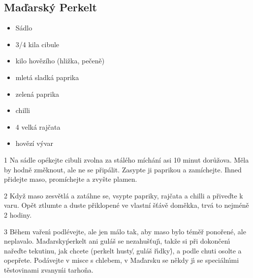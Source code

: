 \documentclass[10pt,a4paper]{article}
\newenvironment{myitemize}
{ \begin{itemize}
    \setlength{\itemsep}{0pt}
    \setlength{\parskip}{0pt}
    \setlength{\parsep}{0pt}     }
{ \end{itemize}                  }
\begin{document}
\subsection{Maďarský Perkelt}
\begin{minipage}[t]{0,5\textwidth}
\begin{myitemize} 
\item Sádlo
\item 3/4 kila cibule
\item kilo hovězího (hližka, pečeně)
\item mletá sladká paprika
\item zelená paprika
\item chilli
\item 4 velká rajčata
\item hovězí vývar
\end{myitemize}
\end{minipage}
\begin{minipage}[t]{0,5\textwidth}
1 Na sádle opékejte cibuli zvolna za stálého míchání asi 10 minut dorůžova. Měla by hodně změknout, ale ne se připálit. Zasypte ji paprikou a zamíchejte. Ihned přidejte maso, promíchejte a zvyšte plamen.

2 Když maso zesvětlá a zatáhne se, vsypte papriky, rajčata a chilli a přiveďte k varu. Opět ztlumte a duste přiklopené ve vlastní šťávě doměkka, trvá to nejméně 2 hodiny.

3 B\v{e}hem va\v{r}en\'{\i} podl\'{e}vejte, ale jen m\'{a}lo \textendash{} tak, aby maso bylo t\'{e}m\v{e}\v{r} pono\v{r}en\'{e}, ale neplavalo. Ma\v{d}arsky\' perkelt ani gul\'{a}\v{s} se nezahu\v{s}\v{t}uj\'{\i}, tak\v{z}e si p\v{r}i dokon\v{c}en\'{\i} na\v{r}e\v{d}te tekutinu, jak chcete (perkelt husty\', gul\'{a}\v{s} \v{r}\'{\i}dky\'), a podle chuti osolte a opep\v{r}ete. Pod\'{a}vejte v misce s chlebem, v Ma\v{d}arsku se n\v{e}kdy j\'{\i} se speci\'{a}ln\'{\i}mi t\v{e}stovinami zvany\'mi tarho\v{n}a.
\end{minipage}
\end{document}
